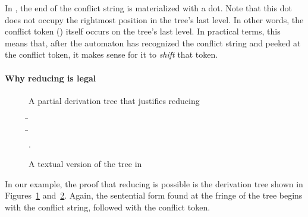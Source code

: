 \documentclass[onecolumn,11pt,nocopyrightspace,preprint]{sigplanconf}
\newenvironment{heveapicture}{
\begin{toimage}
}{
\end{toimage}
\imageflush{}
}
\begin{document}
In , the end of the conflict string is materialized
with a dot. Note that this dot does not occupy the rightmost position in the
tree's last level. In other words, the conflict token () itself
occurs on the tree's last level. In practical terms, this means that, after
the automaton has recognized the conflict string and peeked at the conflict
token, it makes sense for it to \emph{shift} that token.

\paragraph{Why reducing is legal}

\begin{figure}
\mycommonbaseline
\begin{center}
\begin{heveapicture}
\end{heveapicture}
\end{center}
\caption{A partial derivation tree that justifies reducing}
\label{fig:reducing:tree}
\end{figure}

\begin{figure}
\begin{center}
\begin{tabbing}
\=  \\
\>    \=   
                                                               \\
\>                                         \>     .
\end{tabbing}
\end{center}
\caption{A textual version of the tree in }
\label{fig:reducing:text}
\end{figure}

In our example, the proof that reducing is possible is the derivation tree
shown in Figures~\ref{fig:reducing:tree} and~\ref{fig:reducing:text}. Again,
the sentential form found at the fringe of the tree begins with the conflict
string, followed with the conflict token.
\end{document}
